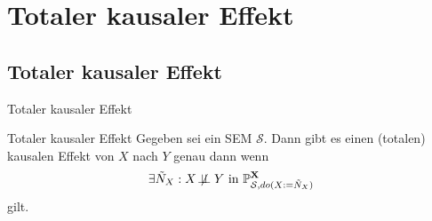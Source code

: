 \section{Totaler kausaler Effekt}
\subsection{Totaler kausaler Effekt}
\begin{frame}{Totaler kausaler Effekt}
    \begin{block}{Totaler kausaler Effekt}
        Gegeben sei ein SEM $\mathcal{S}$. Dann gibt es einen
        (totalen) kausalen Effekt von $X$ nach $Y$ genau dann wenn
        \[\exists \tilde{N}_X : X \not\!\perp\!\!\!\perp Y \text{ in } \mathbb{P}_{\mathcal{S}, do(X:=\tilde{N}_X)}^{\mathbf{X}}\]
        gilt.
    \end{block}
\end{frame}


